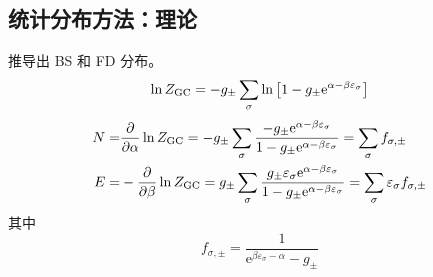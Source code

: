 \subsection{统计分布方法：理论}

\begin{framed}
    推导出 BS 和 FD 分布。\[
        \ln{Z_{\text{GC}}} = - g_{\pm} \sum_{\sigma} \ln \qty[1 - g_{\pm} \mathrm{e}^{\alpha - \beta \varepsilon_{\sigma}}]
    \] \begin{align*}
        N = & \pdv{\alpha} \ln{Z_{\text{GC}}} = - g_{\pm} \sum_{\sigma} \frac{- g_{\pm} \mathrm{e}^{\alpha - \beta \varepsilon_{\sigma}}}{1 - g_{\pm} \mathrm{e}^{\alpha - \beta \varepsilon_{\sigma}}} = \sum_{\sigma} f_{\sigma, \pm}                                        \\
        E = & - \pdv{\beta} \ln{Z_{\text{GC}}} = g_{\pm} \sum_{\sigma} \frac{g_{\pm} \varepsilon_{\sigma} \mathrm{e}^{\alpha - \beta \varepsilon_{\sigma}}}{1 - g_{\pm} \mathrm{e}^{\alpha - \beta \varepsilon_{\sigma}}} = \sum_{\sigma} \varepsilon_{\sigma} f_{\sigma, \pm}
    \end{align*} 其中 \[
        f_{\sigma, \pm} = \frac{1}{\mathrm{e}^{\beta \varepsilon_{\sigma} - \alpha} - g_{\pm} }
    \]
\end{framed}

